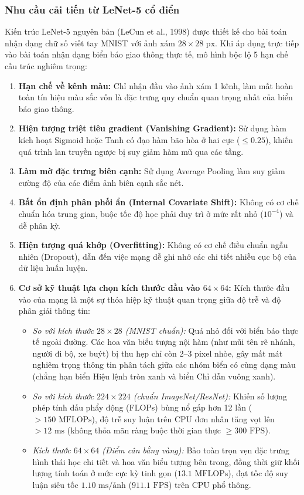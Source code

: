 \subsubsection{Nhu cầu cải tiến từ LeNet-5 cổ điển}
\label{subsubsec:lenet_cai_tien}

Kiến trúc LeNet-5 nguyên bản (LeCun et al., 1998) được thiết kế cho bài toán nhận dạng chữ số viết tay MNIST với ảnh xám $28 \times 28\text{ px}$. Khi áp dụng trực tiếp vào bài toán nhận dạng biển báo giao thông thực tế, mô hình bộc lộ 5 hạn chế cấu trúc nghiêm trọng:

\begin{enumerate}
    \item \textbf{Hạn chế về kênh màu:} Chỉ nhận đầu vào ảnh xám 1 kênh, làm mất hoàn toàn tín hiệu màu sắc vốn là đặc trưng quy chuẩn quan trọng nhất của biển báo giao thông.
    \item \textbf{Hiện tượng triệt tiêu gradient (Vanishing Gradient):} Sử dụng hàm kích hoạt Sigmoid hoặc Tanh có đạo hàm bão hòa ở hai cực ($\le 0.25$), khiến quá trình lan truyền ngược bị suy giảm hàm mũ qua các tầng.
    \item \textbf{Làm mờ đặc trưng biên cạnh:} Sử dụng Average Pooling làm suy giảm cường độ của các điểm ảnh biên cạnh sắc nét.
    \item \textbf{Bất ổn định phân phối ẩn (Internal Covariate Shift):} Không có cơ chế chuẩn hóa trung gian, buộc tốc độ học phải duy trì ở mức rất nhỏ ($10^{-4}$) và dễ phân kỳ.
    \item \textbf{Hiện tượng quá khớp (Overfitting):} Không có cơ chế điều chuẩn ngẫu nhiên (Dropout), dẫn đến việc mạng dễ ghi nhớ các chi tiết nhiễu cục bộ của dữ liệu huấn luyện.
    \item \textbf{Cơ sở kỹ thuật lựa chọn kích thước đầu vào $64 \times 64$:} Kích thước đầu vào của mạng là một sự thỏa hiệp kỹ thuật quan trọng giữa độ trễ và độ phân giải thông tin:
    \begin{itemize}
        \item \textit{So với kích thước $28 \times 28$ (MNIST chuẩn):} Quá nhỏ đối với biển báo thực tế ngoài đường. Các hoa văn biểu tượng nội hàm (như mũi tên rẽ nhánh, người đi bộ, xe buýt) bị thu hẹp chỉ còn 2--3 pixel nhòe, gây mất mát nghiêm trọng thông tin phân tách giữa các nhóm biển có cùng dạng màu (chẳng hạn biển Hiệu lệnh tròn xanh và biển Chỉ dẫn vuông xanh).
        \item \textit{So với kích thước $224 \times 224$ (chuẩn ImageNet/ResNet):} Khiến số lượng phép tính dấu phẩy động (FLOPs) bùng nổ gấp hơn 12 lần ($> 150\text{ MFLOPs}$), độ trễ suy luận trên CPU đơn nhân tăng vọt lên $> 12\text{ ms}$ (không thỏa mãn ràng buộc thời gian thực $\ge 300\text{ FPS}$).
        \item \textit{Kích thước $64 \times 64$ (Điểm cân bằng vàng):} Bảo toàn trọn vẹn đặc trưng hình thái học chi tiết và hoa văn biểu tượng bên trong, đồng thời giữ khối lượng tính toán ở mức cực kỳ tinh gọn ($13.1\text{ MFLOPs}$), đạt tốc độ suy luận siêu tốc $1.10\text{ ms/ảnh}$ ($911.1\text{ FPS}$) trên CPU phổ thông.
    \end{itemize}
\end{enumerate}


